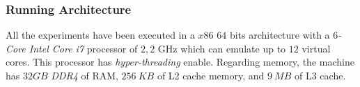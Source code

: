 
\subsubsection{Running Architecture}
All the experiments have been executed in a $x86$ $64$ bits architecture with a \textit{$6$-Core Intel Core i7} processor of $2,2$ GHz which can emulate up to $12$ virtual cores. This processor has \emph{hyper-threading} enable. Regarding memory, the machine has $32 GB$ \emph{DDR4} of RAM, $256\ KB$ of L2 cache memory, and $9\ MB$ of L3 cache.

